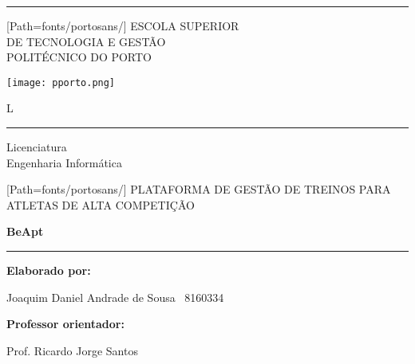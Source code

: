 \thispagestyle{empty}
{
	\setlength{\parindent}{0cm}

	\begin{titlepage}

		\begin{minipage}{.45\textwidth}
			\rule{2cm}{2pt}\vskip0.05cm

			{
				[Path=fonts/portosans/]
				\fontsize{10}{11}\selectfont
				\uppercase{Escola Superior\\
				de Tecnologia e Gestão\\
				Politécnico do Porto}
			}
		\end{minipage}
		\begin{minipage}{.5\textwidth}
			\flushright
			\texttt{[image: pporto.png]}
		\end{minipage}

		\vspace{3.5cm}

		\begin{minipage}{1cm}
			{\fontsize{50}{60}\selectfont L}
		\end{minipage}
		\begin{minipage}{5cm}
			\rule{2cm}{2pt}\vskip0.05cm
			Licenciatura\\
			Engenharia Informática
		\end{minipage}

		\vspace{70pt}

		{
			[Path=fonts/portosans/]
			{\small\uppercase{Plataforma de gestão de treinos para atletas de alta competição}}
		}

		\vspace{0.25cm}

		{\huge\textbf{BeApt}}

		\rule{12cm}{3pt}\vskip0.05cm
		\date


		\vfill

		\begin{flushright}
			\textbf{Elaborado por:}
			\par
			Joaquim Daniel Andrade de Sousa \textemdash~8160334

			\vspace{10pt}

			\textbf{Professor orientador:}
			\par
			Prof. Ricardo Jorge Santos
		\end{flushright}

	\end{titlepage}
}